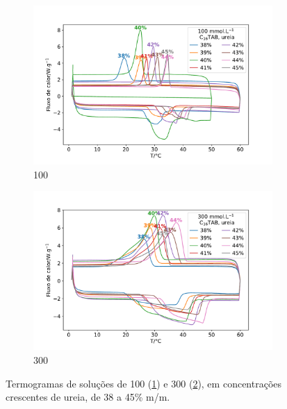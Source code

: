 
	\begin{figure}[h]
		\begin{subfigure}[t]{0.5\textwidth}
			\centering
			\includegraphics[width=\textwidth]{./imagens/dsc/CTAB_porc_ur}
			\caption{\CTAB{} 100 \mM{}}
			\label{fig:DSC_CTAB100_UR38-45}	
		\end{subfigure}%
		\begin{subfigure}[t]{0.5\textwidth}
			\centering
			\includegraphics[width=\textwidth]{./imagens/dsc/CTAB_300_porc_ur}
			\caption{\CTAB{} 300 \mM}
			\label{fig:DSC_CTAB300_UR38-45}
		\end{subfigure}
		\caption{Termogramas de soluções de \CTAB{} 100 \mM{} (\ref{fig:DSC_CTAB100_UR38-45}) e 300 \mM{} (\ref{fig:DSC_CTAB300_UR38-45}), em concentrações crescentes de ureia, de 38 a 45\% m/m.}
		\label{fig:DSC_CTAB_100_300_Ur38-45}
	\end{figure}
	
